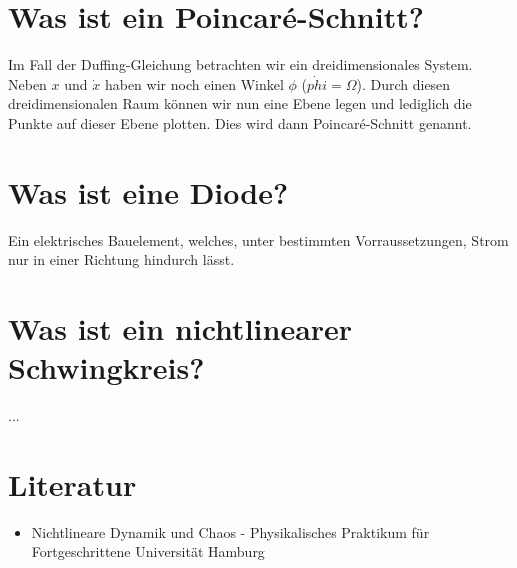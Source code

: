 \documentclass{scrartcl}
\begin{document}
\section{  Was ist ein Poincaré-Schnitt?  }
Im Fall der Duffing-Gleichung betrachten wir ein dreidimensionales System. Neben $x$ und $\dot{x}$ haben wir noch einen Winkel $\phi$ ($\dot{phi}=\Omega$).
Durch diesen dreidimensionalen Raum können wir nun eine Ebene legen und lediglich die Punkte auf dieser Ebene plotten. Dies wird dann Poincaré-Schnitt genannt.
\section{  Was ist eine Diode?  }
Ein elektrisches Bauelement, welches, unter bestimmten Vorraussetzungen, Strom nur in einer Richtung hindurch lässt. 
\section{  Was ist ein nichtlinearer Schwingkreis?  }
...

\section{ Literatur }
\begin{itemize} 
\item Nichtlineare Dynamik und Chaos - Physikalisches Praktikum für Fortgeschrittene Universität Hamburg
\end{itemize}
\end{document}
